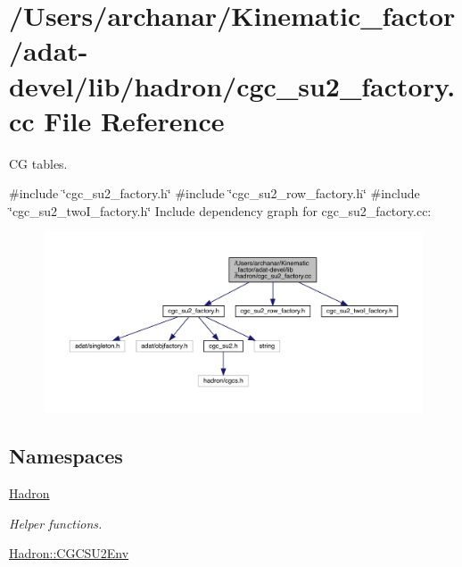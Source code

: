 \hypertarget{adat-devel_2lib_2hadron_2cgc__su2__factory_8cc}{}\section{/\+Users/archanar/\+Kinematic\+\_\+factor/adat-\/devel/lib/hadron/cgc\+\_\+su2\+\_\+factory.cc File Reference}
\label{adat-devel_2lib_2hadron_2cgc__su2__factory_8cc}


CG tables.  


{\ttfamily \#include \char`\"{}cgc\+\_\+su2\+\_\+factory.\+h\char`\"{}}\newline
{\ttfamily \#include \char`\"{}cgc\+\_\+su2\+\_\+row\+\_\+factory.\+h\char`\"{}}\newline
{\ttfamily \#include \char`\"{}cgc\+\_\+su2\+\_\+two\+I\+\_\+factory.\+h\char`\"{}}\newline
Include dependency graph for cgc\+\_\+su2\+\_\+factory.\+cc\+:
\nopagebreak
\begin{figure}[H]
\begin{center}
\leavevmode
\includegraphics[width=350pt]{d7/df7/adat-devel_2lib_2hadron_2cgc__su2__factory_8cc__incl}
\end{center}
\end{figure}
\subsection*{Namespaces}
\begin{DoxyCompactItemize}
\item 
 \mbox{\hyperlink{namespaceHadron}{Hadron}}
\begin{DoxyCompactList}\small\item\em Helper functions. \end{DoxyCompactList}\item 
 \mbox{\hyperlink{namespaceHadron_1_1CGCSU2Env}{Hadron\+::\+C\+G\+C\+S\+U2\+Env}}
\end{DoxyCompactItemize}
